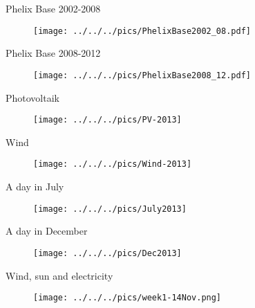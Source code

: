 
{Phelix Base 2002-2008}
\begin{figure}[htp]
\centering
\texttt{[image: ../../../pics/PhelixBase2002\_08.pdf]}

\end{figure}




{Phelix Base 2008-2012}
\begin{figure}[htp]
\centering
\texttt{[image: ../../../pics/PhelixBase2008\_12.pdf]}

\end{figure}



{Photovoltaik}
\begin{figure}[htp]
\centering
\texttt{[image: ../../../pics/PV-2013]}
\label{prices}
\end{figure}



{Wind}
\begin{figure}[htp]
\centering
\texttt{[image: ../../../pics/Wind-2013]}
\label{prices}
\end{figure}





{A day in July}
\begin{figure}[htp]
\centering
\texttt{[image: ../../../pics/July2013]}
\end{figure}



{A day in December}
\begin{figure}[htp]
\centering
\texttt{[image: ../../../pics/Dec2013]}
\end{figure}



{Wind, sun and electricity}
\begin{figure}[htp]
\centering
\texttt{[image: ../../../pics/week1-14Nov.png]}
\end{figure}



